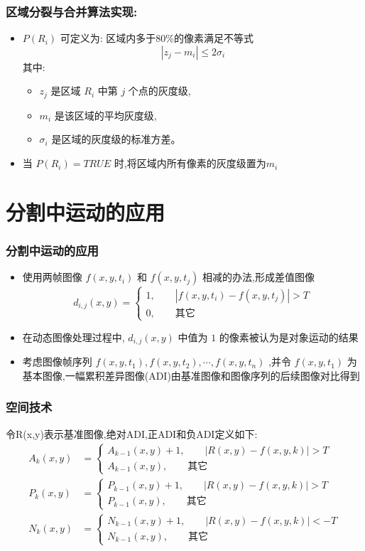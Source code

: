 \documentclass{beamer}
\begin{document}
\begin{frame}
\frametitle{区域分裂与合并算法实现:}
\label{sec-5-5}


\begin{itemize}
\item $P(R_i)$ 可定义为:  区域内多于80\%的像素满足不等式
       \[|z_j-m_i|\leq 2σ_i\]
      其中:
\begin{itemize}
\item $z_j$ 是区域 $R_i$ 中第 $j$ 个点的灰度级,
\item $m_i$ 是该区域的平均灰度级,
\item $σ_i$ 是区域的灰度级的标准方差。
\end{itemize}
\item 当 $P(R_i)=TRUE$ 时,将区域内所有像素的灰度级置为$m_i$
\end{itemize}
\end{frame}
\section{分割中运动的应用}
\label{sec-6}

 
\begin{frame}
\frametitle{分割中运动的应用}
\label{sec-6-1}


\begin{itemize}
\item 使用两帧图像 $f(x,y,t_i)$ 和 $f(x,y,t_j)$ 相减的办法,形成差值图像
      \[d_{i,j}(x,y)=\begin{cases} 1, \qquad |f(x,y,t_i)-f(x,y,t_j)|>T \\   0,\qquad \text{其它} \end{cases}\]
\item 在动态图像处理过程中, $d_{i,j}(x,y)$ 中值为 $1$ 的像素被认为是对象运动的结果
\item 考虑图像帧序列 $f(x,y,t_1),f(x,y,t_2),\cdots,f(x,y,t_n)$ ,并令 $f(x,y,t_1)$ 为基本图像,一幅累积差异图像(ADI)由基准图像和图像序列的后续图像对比得到
\end{itemize}
\end{frame}
\begin{frame}
\frametitle{空间技术}
\label{sec-6-2}

  令R(x,y)表示基准图像,绝对ADI,正ADI和负ADI定义如下:
\begin{align*}
A_k(x,y)&=\begin{cases} A_{k-1}(x,y)+1, \qquad |R(x,y)-f(x,y,k)|>T \\
                       A_{k-1}(x,y) , \qquad \text{其它}\end{cases}\\
P_k(x,y)&=\begin{cases} P_{k-1}(x,y)+1, \qquad |R(x,y)-f(x,y,k)|>T \\
                       P_{k-1}(x,y) , \qquad \text{其它}\end{cases}\\
N_k(x,y)&=\begin{cases} N_{k-1}(x,y)+1, \qquad |R(x,y)-f(x,y,k)|<-T \\
                       N_{k-1}(x,y) , \qquad \text{其它}\end{cases}
\end{align*}
\end{frame}
\end{document}
